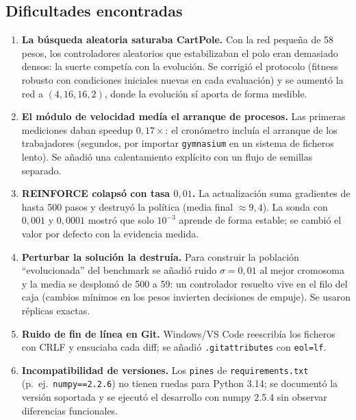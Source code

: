 \subsection{Dificultades encontradas}

\begin{enumerate}
  \item \textbf{La búsqueda aleatoria saturaba CartPole.} Con la red pequeña de 58 pesos, los controladores aleatorios que estabilizaban el polo eran demasiado densos: la suerte competía con la evolución. Se corrigió el protocolo (fitness robusto con condiciones iniciales nuevas en cada evaluación) y se aumentó la red a $(4,16,16,2)$, donde la evolución sí aporta de forma medible.
  \item \textbf{El módulo de velocidad medía el arranque de procesos.} Las primeras mediciones daban speedup $0{,}17\times$: el cronómetro incluía el arranque de los trabajadores (segundos, por importar \texttt{gymnasium} en un sistema de ficheros lento). Se añadió una calentamiento explícito con un flujo de semillas separado.
  \item \textbf{REINFORCE colapsó con tasa $0{,}01$.} La actualización suma gradientes de hasta 500 pasos y destruyó la política (media final $\approx 9{,}4$). La sonda con $0{,}001$ y $0{,}0001$ mostró que solo $10^{-3}$ aprende de forma estable; se cambió el valor por defecto con la evidencia medida.
  \item \textbf{Perturbar la solución la destruía.} Para construir la población ``evolucionada'' del benchmark se añadió ruido $\sigma = 0{,}01$ al mejor cromosoma y la media se desplomó de 500 a 59: un controlador resuelto vive en el filo del caja (cambios mínimos en los pesos invierten decisiones de empuje). Se usaron réplicas exactas.
  \item \textbf{Ruido de fin de línea en Git.} Windows/VS Code reescribía los ficheros con CRLF y ensuciaba cada diff; se añadió \texttt{.gitattributes} con \texttt{eol=lf}.
  \item \textbf{Incompatibilidad de versiones.} Los \texttt{pines} de \texttt{requirements.txt} (p.\ ej.\ \texttt{numpy==2.2.6}) no tienen ruedas para Python 3.14; se documentó la versión soportada y se ejecutó el desarrollo con numpy 2.5.4 sin observar diferencias funcionales.
\end{enumerate}
